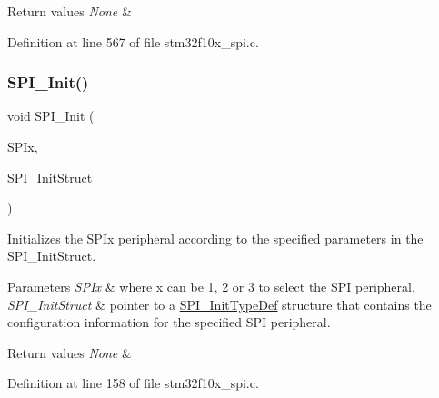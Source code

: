 \begin{DoxyRetVals}{Return values}
{\em None} & \\
\hline
\end{DoxyRetVals}


Definition at line 567 of file stm32f10x\+\_\+spi.\+c.

\mbox{\label{group___s_p_i___exported___functions_ga8dacc1dc48bf08c0f12da409f4889037}} 
\subsubsection{\texorpdfstring{S\+P\+I\+\_\+\+Init()}{SPI\_Init()}}
{\footnotesize\ttfamily void S\+P\+I\+\_\+\+Init (\begin{DoxyParamCaption}\item[{\hyperlink{struct_s_p_i___type_def}{S\+P\+I\+\_\+\+Type\+Def} $\ast$}]{S\+P\+Ix,  }\item[{\hyperlink{struct_s_p_i___init_type_def}{S\+P\+I\+\_\+\+Init\+Type\+Def} $\ast$}]{S\+P\+I\+\_\+\+Init\+Struct }\end{DoxyParamCaption})}



Initializes the S\+P\+Ix peripheral according to the specified parameters in the S\+P\+I\+\_\+\+Init\+Struct. 


\begin{DoxyParams}{Parameters}
{\em S\+P\+Ix} & where x can be 1, 2 or 3 to select the S\+PI peripheral. \\
\hline
{\em S\+P\+I\+\_\+\+Init\+Struct} & pointer to a \hyperlink{struct_s_p_i___init_type_def}{S\+P\+I\+\_\+\+Init\+Type\+Def} structure that contains the configuration information for the specified S\+PI peripheral. \\
\hline
\end{DoxyParams}

\begin{DoxyRetVals}{Return values}
{\em None} & \\
\hline
\end{DoxyRetVals}


Definition at line 158 of file stm32f10x\+\_\+spi.\+c.

\mbox{\label{group___s_p_i___exported___functions_ga56fc508a482f032f9eb80e4c63184126}} 
